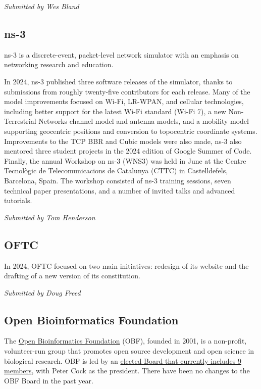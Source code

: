 \documentclass[a4paper]{report}
\begin{document}
{\em Submitted by Wes Bland}

\subsection{ns-3}

ns-3 is a discrete-event, packet-level network simulator with an emphasis on networking research and education.

In 2024, ns-3 published three software releases of the simulator, thanks to submissions from roughly twenty-five contributors for each release. Many of the model improvements focused on Wi-Fi, LR-WPAN, and cellular technologies, including better support for the latest Wi-Fi standard (Wi-Fi 7), a new Non-Terrestrial Networks channel model and antenna models, and a mobility model supporting geocentric positions and conversion to topocentric coordinate systems. Improvements to the TCP BBR and Cubic models were also made,  ns-3 also mentored three student projects in the 2024 edition of Google Summer of Code. Finally, the annual Workshop on ns-3 (WNS3) was held in June at the Centre Tecnològic de Telecomunicacions de Catalunya (CTTC) in Castelldefels, Barcelona, Spain.  The workshop consisted of ns-3 training sessions, seven technical paper presentations, and a number of invited talks and advanced tutorials.

{\em Submitted by Tom Henderson}

\subsection{OFTC}

In 2024, OFTC focused on two main initiatives: redesign of its website and the drafting of a new version of its constitution.

{\em Submitted by Doug Freed}

\subsection{Open Bioinformatics Foundation}

The \href{https://www.open-bio.org/}{Open Bioinformatics Foundation} (OBF), founded in 2001, is a non-profit, volunteer-run group that promotes open source development and open science in biological research. OBF is led by an \href{https://www.open-bio.org/board/}{elected Board that currently includes 9 members}, with Peter Cock as the president. There have been no changes to the OBF Board in the past year.
\end{document}
